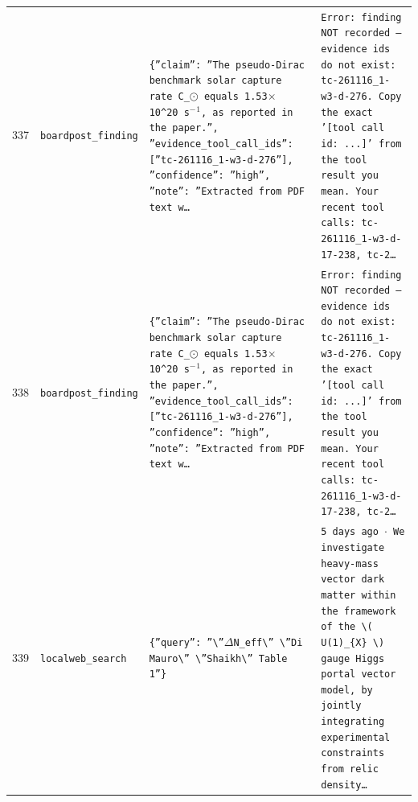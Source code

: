 \documentclass[11pt,a4paper]{article}
\begin{document}
\begin{longtable}{@{}p{}p{}p{}p{}@{}}
337 & \texttt{board}\newline\texttt{post\_\allowbreak{}finding} & \texttt{\{''claim'':\allowbreak{} ''The pseudo-Dirac benchmark solar capture rate C\_\allowbreak{}$\odot$ equals 1.53$\times$10\textasciicircum{}\allowbreak{}20~s$^-$$^1$,\allowbreak{} as reported in the paper.'',\allowbreak{} ''evidence\_\allowbreak{}tool\_\allowbreak{}call\_\allowbreak{}ids'':\allowbreak{} [''tc-261116\_\allowbreak{}1-w3-d-276'']\allowbreak{},\allowbreak{} ''confidence'':\allowbreak{} ''high'',\allowbreak{} ''note'':\allowbreak{} ''Extracted from PDF text w\ldots{}\allowbreak{}} & \texttt{Error:\allowbreak{} finding NOT recorded --- evidence ids do not exist:\allowbreak{} tc-261116\_\allowbreak{}1-w3-d-276. Copy the exact '[tool call id:\allowbreak{} ...]\allowbreak{}' from the tool result you mean. Your recent tool calls:\allowbreak{} tc-261116\_\allowbreak{}1-w3-d-17-238,\allowbreak{} tc-2\ldots{}\allowbreak{}} \\
338 & \texttt{board}\newline\texttt{post\_\allowbreak{}finding} & \texttt{\{''claim'':\allowbreak{} ''The pseudo-Dirac benchmark solar capture rate C\_\allowbreak{}$\odot$ equals 1.53$\times$10\textasciicircum{}\allowbreak{}20~s$^-$$^1$,\allowbreak{} as reported in the paper.'',\allowbreak{} ''evidence\_\allowbreak{}tool\_\allowbreak{}call\_\allowbreak{}ids'':\allowbreak{} [''tc-261116\_\allowbreak{}1-w3-d-276'']\allowbreak{},\allowbreak{} ''confidence'':\allowbreak{} ''high'',\allowbreak{} ''note'':\allowbreak{} ''Extracted from PDF text w\ldots{}\allowbreak{}} & \texttt{Error:\allowbreak{} finding NOT recorded --- evidence ids do not exist:\allowbreak{} tc-261116\_\allowbreak{}1-w3-d-276. Copy the exact '[tool call id:\allowbreak{} ...]\allowbreak{}' from the tool result you mean. Your recent tool calls:\allowbreak{} tc-261116\_\allowbreak{}1-w3-d-17-238,\allowbreak{} tc-2\ldots{}\allowbreak{}} \\
339 & \texttt{local}\newline\texttt{web\_\allowbreak{}search} & \texttt{\{''query'':\allowbreak{} ''\textbackslash{}\allowbreak{}''$\Delta$N\_\allowbreak{}eff\textbackslash{}\allowbreak{}'' \textbackslash{}\allowbreak{}''Di Mauro\textbackslash{}\allowbreak{}'' \textbackslash{}\allowbreak{}''Shaikh\textbackslash{}\allowbreak{}'' Table 1''\}\allowbreak{}} & \texttt{5 days ago $\cdot$ We investigate heavy-mass vector dark matter within the framework of the \textbackslash{}\allowbreak{}( U(1)\allowbreak{}\_\allowbreak{}\{X\}\allowbreak{} \textbackslash{}\allowbreak{})\allowbreak{} gauge Higgs portal vector model,\allowbreak{} by jointly integrating experimental constraints from relic density\ldots{}\allowbreak{}} \\

\end{longtable}
\end{document}
